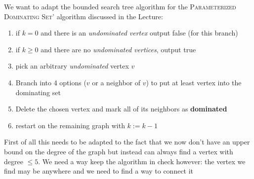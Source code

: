 \documentclass{article}
\begin{document}
\begin{solving}
    We want to adapt the bounded search tree algorithm for the \textsc{Parameterized Dominating Set'} algorithm discussed in the Lecture: \begin{enumerate}
        \item if $k = 0$ and there is an \textit{undominated vertex} output false (for this branch)
        \item if $k\geq 0$ and there are no \textit{undominated vertices}, output true
        \item pick an arbitrary \textit{undominated} vertex $v$
        \item Branch into 4 options ($v$ or a neighbor of $v$) to put at least vertex into the dominating set
        \item Delete the chosen vertex and mark all of its neighbors as \textbf{dominated}
        \item restart on the remaining graph with $k:= k-1$
    \end{enumerate}
    First of all this needs to be adapted to the fact that we now don't have an upper bound on the degree of the graph but instead can always find a vertex with degree $\leq 5$. We need a way keep the algorithm in check however: the vertex we find may be anywhere and we need to find a way to connect it \\


\end{solving}
\end{document}
